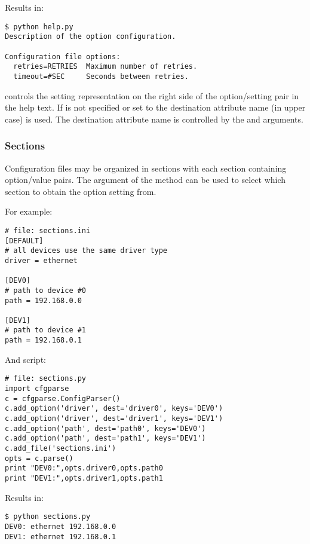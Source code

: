 \documentclass{howto}
\begin{document}
Results in:
\begin{verbatim}
$ python help.py
Description of the option configuration.

Configuration file options:
  retries=RETRIES  Maximum number of retries.
  timeout=#SEC     Seconds between retries.
\end{verbatim}

 controls the setting representation on the right side of the 
option/setting pair in the help text.  If  is not specified or
set to  the destination attribute name (in upper case) is used.
The destination attribute name is controlled by the  and 
 arguments.

\subsubsection{Sections}

Configuration files may be organized in sections with each section containing
option/value pairs.  The  argument of the  method
can be used to select which section to obtain the option setting from.

For example:

\begin{verbatim}
# file: sections.ini
[DEFAULT]
# all devices use the same driver type
driver = ethernet

[DEV0]
# path to device #0
path = 192.168.0.0

[DEV1]
# path to device #1
path = 192.168.0.1
\end{verbatim}

And script:

\begin{verbatim}
# file: sections.py
import cfgparse
c = cfgparse.ConfigParser()
c.add_option('driver', dest='driver0', keys='DEV0')
c.add_option('driver', dest='driver1', keys='DEV1')
c.add_option('path', dest='path0', keys='DEV0')
c.add_option('path', dest='path1', keys='DEV1')
c.add_file('sections.ini')
opts = c.parse()
print "DEV0:",opts.driver0,opts.path0
print "DEV1:",opts.driver1,opts.path1
\end{verbatim}

Results in:
\begin{verbatim}
$ python sections.py
DEV0: ethernet 192.168.0.0
DEV1: ethernet 192.168.0.1
\end{verbatim}
\end{document}
